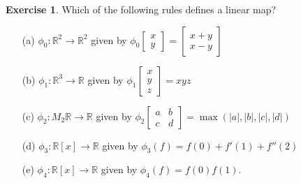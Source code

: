 \documentclass{amsart}
\newcommand{\R}         {{\mathbb{R}}}
\newcommand{\bsm}       {\left[\begin{smallmatrix}}
\newcommand{\esm}       {\end{smallmatrix}\right]}
\renewcommand{\:}       {\colon}
\theoremstyle{definition}
\newtheorem{exercise}{Exercise}[section]
\begin{document}
\begin{exercise}
 Which of the following rules defines a linear map?
 \begin{itemize}
  \item[(a)] $\phi_0\:\R^2\to\R^2$ given by
   $\phi_0\bsm x\\ y\esm=\bsm x+y\\ x-y\esm$
  \item[(b)] $\phi_1\:\R^3\to\R$ given by 
   $\phi_1\bsm x\\ y\\ z\esm=xyz$
  \item[(c)] $\phi_2\:M_2\R\to\R$ given by
   $\phi_2\bsm a&b\\ c&d\esm=\max(|a|,|b|,|c|,|d|)$
  \item[(d)] $\phi_3\:\R[x]\to\R$ given by
   $\phi_3(f)=f(0)+f'(1)+f''(2)$
  \item[(e)] $\phi_4\:\R[x]\to\R$ given by
   $\phi_4(f)=f(0)f(1)$.  
 \end{itemize}
\end{exercise}
\end{document}
